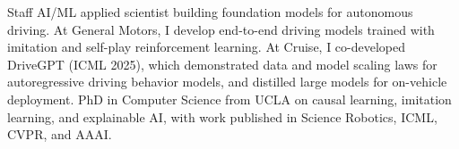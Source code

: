 

\begin{cvparagraph}
Staff AI/ML applied scientist building foundation models for autonomous driving. At General Motors, I develop end-to-end driving models trained with imitation and self-play reinforcement learning. At Cruise, I co-developed DriveGPT (ICML 2025), which demonstrated data and model scaling laws for autoregressive driving behavior models, and distilled large models for on-vehicle deployment. PhD in Computer Science from UCLA on causal learning, imitation learning, and explainable AI, with work published in Science Robotics, ICML, CVPR, and AAAI.
\end{cvparagraph}
